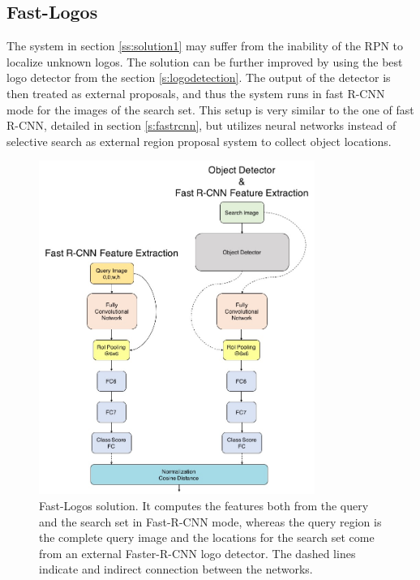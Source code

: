 \subsection{Fast-Logos}\label{ss:solution3}
The system in section \ref{ss:solution1} may suffer from the inability of the RPN to localize unknown logos. The solution can be further improved by using the best logo detector from the section \ref{s:logodetection}.  The output of the detector is then treated as external proposals, and thus the system runs in fast R-CNN mode for the images of the search set. This setup is very similar to the one of fast R-CNN, detailed in section \ref{s:fastrcnn}, but utilizes neural networks instead of selective search as external region proposal system to collect object locations.
\begin{figure}
  \centering
  \includegraphics[width=90mm]{images/mt/sol3_arch.jpg}
  \caption{Fast-Logos solution. It computes the features both from the query and the search set in Fast-R-CNN mode, whereas the query region is the complete query image and the locations for the search set come from an external Faster-R-CNN logo detector. The dashed lines indicate and indirect connection between the networks.}
  \label{f:sol3arch}
\end{figure}
